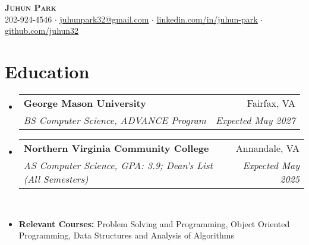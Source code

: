 \documentclass[letterpaper,11pt]{article}
\makeatletter
\newcommand{\resumeItem}[1]{
  \item\small{
    {#1 \vspace{-3pt}}
  }
}
\newcommand{\resumeSubheading}[4]{
  \vspace{-2pt}\item
    \begin{tabular*}{0.97\textwidth}[t]{l@{\extracolsep{\fill}}r@{\hspace{-0.2in}}}
        \textbf{#1} & #2 \\
        \textit{\small#3} & \textit{\small #4} \\
    \end{tabular*}\vspace{-1pt}
}
\newcommand{\resumeSubHeadingListStart}{\begin{itemize}[leftmargin=0.00in, rightmargin=-0.2in, label={}]}
\newcommand{\resumeSubHeadingListEnd}{\end{itemize}}
\makeatother
\begin{document}
\begin{center}
    \textbf{\Huge \scshape {Juhun Park}} \\ \vspace{1pt}
    \small 202-924-4546 $\cdot$ 
    \href{mailto:riann3207@gmail.com}{\underline{juhunpark32@gmail.com}} $\cdot$
    \href{https://linkedin.com/in/juhun-park}{\underline{linkedin.com/in/juhun-park}} $\cdot$
    \href{https://github.com/juhun32}{\underline{github.com/juhun32}} \\
\end{center}


\section{Education}
    \resumeSubHeadingListStart
        \resumeSubheading
            {George Mason University}{Fairfax, VA}
            {BS Computer Science, ADVANCE Program}{Expected May 2027}

        \resumeSubheading
            {Northern Virginia Community College}{Annandale, VA}
            {AS Computer Science, GPA: 3.9; Dean's List (All Semesters)}{Expected May 2025} \\
        
        \resumeItem{\textbf{Relevant Courses: }{Problem Solving and Programming, Object Oriented Programming, Data Structures and Analysis of Algorithms}}
    \resumeSubHeadingListEnd

\end{document}
